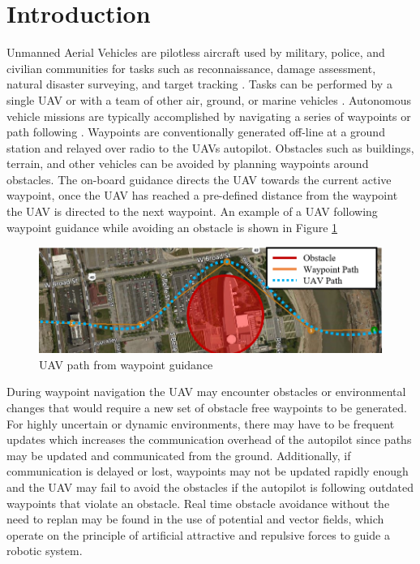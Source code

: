 \documentclass[conf]{new-aiaa}
\begin{document}
\section{Introduction}
Unmanned Aerial Vehicles are pilotless aircraft used by military, police, and civilian communities for tasks such as reconnaissance, damage assessment, natural disaster surveying, and target tracking \cite{ariyur_autonomous_2008,teuliere_chasing_2011}. Tasks can be performed by a single UAV or with a team of other air, ground, or marine vehicles \cite{oh_coordinated_2013,hyondong_oh_coordinated_2015,ulun_coordinated_2013}. Autonomous vehicle missions are typically accomplished by navigating a series of waypoints \cite{ariyur_autonomous_2008} or path following \cite{oliveira_moving_2016}. Waypoints are conventionally generated off-line at a ground station and relayed over radio to the UAVs autopilot. Obstacles such as buildings, terrain, and other vehicles can be avoided by planning waypoints around obstacles. The on-board guidance directs the UAV towards the current active waypoint, once the UAV has reached a pre-defined distance from the waypoint the UAV is directed to the next waypoint. An example of a UAV following waypoint guidance while avoiding an obstacle is shown in Figure \ref{fig:simplewaypointsWithUAVPath}


\begin{figure}[H]
	\centering
	\includegraphics[width=1\linewidth]{Figures/simpleWaypointsWithUAVPath}
	\caption{UAV path from waypoint guidance}
	\label{fig:simplewaypointsWithUAVPath}
\end{figure}


During waypoint navigation the UAV may encounter obstacles or environmental changes that would require a new set of obstacle free waypoints to be generated. For highly uncertain or dynamic environments, there may have to be frequent updates which increases the communication overhead of the autopilot since paths may be updated and communicated from the ground. Additionally, if communication is delayed or lost, waypoints may not be updated rapidly enough and the UAV may fail to avoid the obstacles if the autopilot is following outdated waypoints that violate an obstacle. Real time obstacle avoidance without the need to replan may be found in the use of potential and vector fields, which operate on the principle of artificial attractive and repulsive forces to guide a robotic system. 
\end{document}
